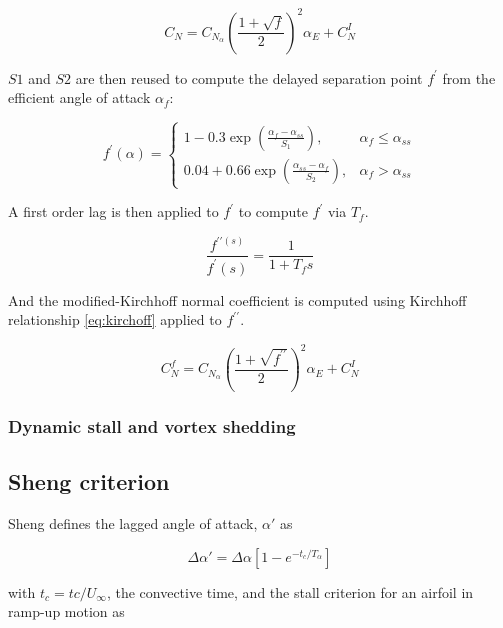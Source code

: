 \begin{equation}
C_{N} = C_{N_{\alpha}}\left(\frac{1+\sqrt{f}}{2}\right)^{2} \alpha_{E}+C_{N}^{I}
\label{eq:kirchhoff}
\end{equation}

$S1$ and $S2$ are then reused to compute the delayed separation point $f^{\prime}$ from the efficient angle of attack $\alpha_f$:

\begin{equation}
f^{\prime}(\alpha)=\left\{\begin{array}{ll}
1-0.3 \exp \left(\frac{\alpha_{f}-\alpha_{ss}}{S_{1}}\right), & \alpha_{f} \leq \alpha_{ss} \\
0.04+0.66 \exp \left(\frac{\alpha_{ss}-\alpha_{f}}{S_{2}}\right), & \alpha_{f}>\alpha_{ss}
\end{array}\right.
\end{equation}

A first order lag is then applied to $f^{\prime}$ to compute $f^{\prime}$ via $T_f$. 

\begin{equation}
\frac{f^{\prime \prime (s)}}{f^{\prime} (s)} = \frac{1}{1 + T_f s}
\label{•}
\end{equation}

And the modified-Kirchhoff normal coefficient is computed using Kirchhoff relationship \eqref{eq:kirchoff} applied to $f^{\prime \prime}$. 

\begin{equation}
	C_{N}^{f}=C_{N_{\alpha}}\left(\frac{1+\sqrt{f^{\prime \prime}}}{2}\right)^{2} \alpha_{E}+C_{N}^{I}\label{eq:mod_kirchoff}
\end{equation}

\subsubsection{Dynamic stall and vortex shedding}


\subsection{Sheng criterion}

Sheng defines the lagged angle of attack, $\alpha'$ as

\begin{equation}
\Delta \alpha' = \Delta \alpha\left[1-e^{-t_c/T_\alpha} \right]
\label{eq:alpha_lag}
\end{equation}

\noindent with $t_c=tc/U_{\infty}$, the convective time, and the stall criterion for an airfoil in ramp-up motion as 

